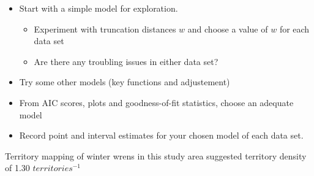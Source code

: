 \documentclass[a4paper]{article}
\begin{document}
\begin{itemize}
	\item Start with a simple model for exploration.
	\begin{itemize}
		\item Experiment with truncation distances $w$ and choose a value of $w$ for each data set
		\item Are there any troubling issues in either data set?
	\end{itemize}
%
{%
}

	\item Try some other models (key functions and adjustement)
	\item From AIC scores, plots and goodness-of-fit statistics, choose an adequate model
	\item Record point and interval estimates for your chosen model of each data set.
\end{itemize}

Territory mapping of winter wrens in this study area suggested territory density of 1.30 $territories^{-1}$
\end{document}
